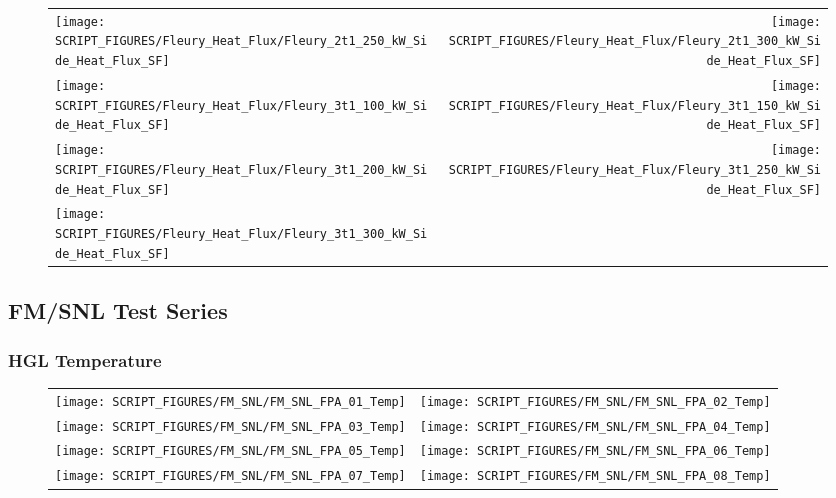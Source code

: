 \begin{figure}[p]
\begin{tabular*}{\textwidth}{l@{\extracolsep{\fill}}r}
\texttt{[image: SCRIPT\_FIGURES/Fleury\_Heat\_Flux/Fleury\_2t1\_250\_kW\_Side\_Heat\_Flux\_SF]} &
\texttt{[image: SCRIPT\_FIGURES/Fleury\_Heat\_Flux/Fleury\_2t1\_300\_kW\_Side\_Heat\_Flux\_SF]} \\
\texttt{[image: SCRIPT\_FIGURES/Fleury\_Heat\_Flux/Fleury\_3t1\_100\_kW\_Side\_Heat\_Flux\_SF]} &
\texttt{[image: SCRIPT\_FIGURES/Fleury\_Heat\_Flux/Fleury\_3t1\_150\_kW\_Side\_Heat\_Flux\_SF]} \\
\texttt{[image: SCRIPT\_FIGURES/Fleury\_Heat\_Flux/Fleury\_3t1\_200\_kW\_Side\_Heat\_Flux\_SF]} &
\texttt{[image: SCRIPT\_FIGURES/Fleury\_Heat\_Flux/Fleury\_3t1\_250\_kW\_Side\_Heat\_Flux\_SF]} \\
\texttt{[image: SCRIPT\_FIGURES/Fleury\_Heat\_Flux/Fleury\_3t1\_300\_kW\_Side\_Heat\_Flux\_SF]}
\end{tabular*}
\end{figure}

\clearpage

\subsection{FM/SNL Test Series}

\subsubsection{HGL Temperature}

\begin{figure}[p]
\begin{tabular*}{\textwidth}{l@{\extracolsep{\fill}}r}
\texttt{[image: SCRIPT\_FIGURES/FM\_SNL/FM\_SNL\_FPA\_01\_Temp]} &
\texttt{[image: SCRIPT\_FIGURES/FM\_SNL/FM\_SNL\_FPA\_02\_Temp]} \\
\texttt{[image: SCRIPT\_FIGURES/FM\_SNL/FM\_SNL\_FPA\_03\_Temp]} &
\texttt{[image: SCRIPT\_FIGURES/FM\_SNL/FM\_SNL\_FPA\_04\_Temp]} \\
\texttt{[image: SCRIPT\_FIGURES/FM\_SNL/FM\_SNL\_FPA\_05\_Temp]} &
\texttt{[image: SCRIPT\_FIGURES/FM\_SNL/FM\_SNL\_FPA\_06\_Temp]} \\
\texttt{[image: SCRIPT\_FIGURES/FM\_SNL/FM\_SNL\_FPA\_07\_Temp]} &
\texttt{[image: SCRIPT\_FIGURES/FM\_SNL/FM\_SNL\_FPA\_08\_Temp]}
\end{tabular*}
\end{figure}


